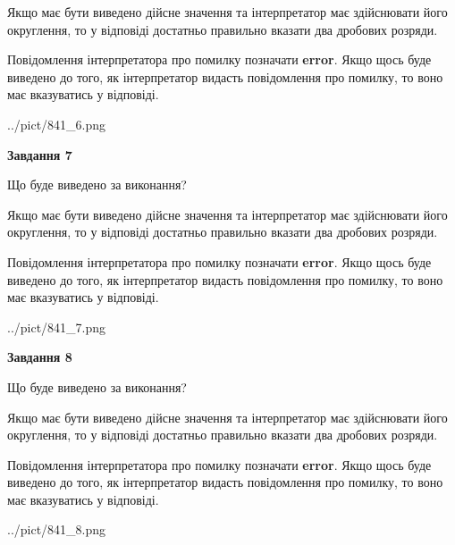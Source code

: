 \documentclass[12pt, ukrainian]{article}
\begin{document}
{\begin {Large}
Якщо має бути виведено дійсне значення та інтерпретатор має здійснювати його округлення, 
то у відповіді достатньо правильно вказати два дробових розряди.

Повідомлення інтерпретатора про помилку позначати \textbf{error}.
Якщо щось буде виведено до того, як інтерпретатор видасть повідомлення про помилку, 
то воно має вказуватись у відповіді. \par

\begin{center}
	{../pict/841_6.png}
\end{center}
\newpage

{\begin {center}\textbf{Завдання 7}\end {center}}\par
Що буде виведено за виконання? \par

Якщо має бути виведено дійсне значення та інтерпретатор має здійснювати його округлення, 
то у відповіді достатньо правильно вказати два дробових розряди.

Повідомлення інтерпретатора про помилку позначати \textbf{error}.
Якщо щось буде виведено до того, як інтерпретатор видасть повідомлення про помилку, 
то воно має вказуватись у відповіді. \par

\begin{center}
	{../pict/841_7.png}
\end{center}
\newpage

{\begin {center}\textbf{Завдання 8}\end {center}}\par
Що буде виведено за виконання? \par

Якщо має бути виведено дійсне значення та інтерпретатор має здійснювати його округлення, 
то у відповіді достатньо правильно вказати два дробових розряди.

Повідомлення інтерпретатора про помилку позначати \textbf{error}.
Якщо щось буде виведено до того, як інтерпретатор видасть повідомлення про помилку, 
то воно має вказуватись у відповіді. \par

\begin{center}
	{../pict/841_8.png}
\end{center}
\newpage


\end{Large}}
\end{document}
